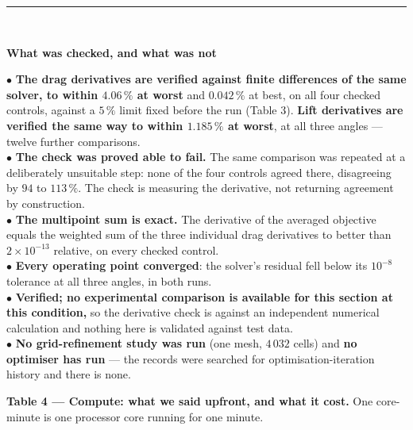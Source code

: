 \documentclass[9pt,a4paper]{article}
\renewcommand{\footnotesize}{\fontsize{6.4}{6.85}\selectfont}
\begin{document}
\vspace{2pt}
{\color{rulegrey}\rule{\textwidth}{0.5pt}}\\[1pt]
\begin{minipage}[t]{0.605\textwidth}
\textbf{What was checked, and what was not}

\vspace{1pt}
{\footnotesize
$\bullet$ \textbf{The drag derivatives are verified against finite differences
of the same solver, to within $4.06\,\%$ at worst} and $0.042\,\%$ at best, on
all four checked controls, against a $5\,\%$ limit fixed before the run
(Table 3). \textbf{Lift derivatives are verified the same way to within
$1.185\,\%$ at worst}, at all three angles --- twelve further comparisons.\\
$\bullet$ \textbf{The check was proved able to fail.} The same comparison was
repeated at a deliberately unsuitable step: none of the four controls agreed
there, disagreeing by $94$ to $113\,\%$. The check is measuring the derivative,
not returning agreement by construction.\\
$\bullet$ \textbf{The multipoint sum is exact.} The derivative of the averaged
objective equals the weighted sum of the three individual drag derivatives to
better than $2\times10^{-13}$ relative, on every checked control.\\
$\bullet$ \textbf{Every operating point converged}: the solver's residual fell
below its $10^{-8}$ tolerance at all three angles, in both runs.\\
$\bullet$ \textbf{Verified; no experimental comparison is available for this
section at this condition,} so the derivative check is against an independent
numerical calculation and nothing here is validated against test data.\\
$\bullet$ \textbf{No grid-refinement study was run} (one mesh, $4\,032$ cells)
and \textbf{no optimiser has run} --- the records were searched for
optimisation-iteration history and there is none.}

\vspace{3pt}
\textbf{Table 4 --- Compute: what we said upfront, and what it cost.}
One core-minute is one processor core running for one minute.


\end{minipage}
\end{document}
